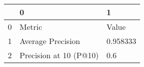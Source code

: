 \begin{tabular}{lll}
\toprule
{} &                       0 &         1 \\
\midrule
0 &                  Metric &     Value \\
1 &       Average Precision &  0.958333 \\
2 &  Precision at 10 (P@10) &       0.6 \\
\bottomrule
\end{tabular}
